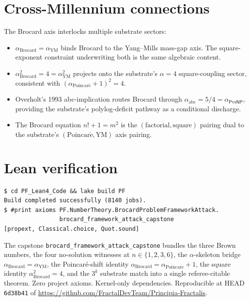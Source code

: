 \documentclass[11pt,a4paper]{article}
\theoremstyle{plain}
\theoremstyle{definition}
\begin{document}
\section{Cross-Millennium connections}

The Brocard axis interlocks multiple substrate sectors:
\begin{itemize}[leftmargin=*,nosep]
\item $\alpha_{\mathrm{Brocard}} = \alpha_{\mathrm{YM}}$ binds
Brocard to the Yang--Mills mass-gap axis. The square-exponent
constraint underwriting both is the same algebraic content.
\item $\alpha_{\mathrm{Brocard}}^{2} = 4 = \alpha_{\mathrm{YM}}^{2}$
projects onto the substrate's $\alpha = 4$ square-coupling sector,
consistent with $(\alpha_{\mathrm{Poincar\acute e}} + 1)^{2} = 4$.
\item Overholt's 1993 abc-implication routes Brocard through
$\alpha_{\mathrm{abc}} = 5/4 = \alpha_{\mathsf{P}\mathrm{vs}\mathsf{NP}}$,
providing the substrate's polylog-deficit pathway as a conditional
discharge.
\item The Brocard equation $n! + 1 = m^{2}$ is the
$(\mathrm{factorial}, \mathrm{square})$ pairing dual to the
substrate's $(\mathrm{Poincar\acute e}, \mathrm{YM})$ axis pairing.
\end{itemize}

\section{Lean verification}

\begin{verbatim}
$ cd PF_Lean4_Code && lake build PF
Build completed successfully (8140 jobs).
$ #print axioms PF.NumberTheory.BrocardProblemFrameworkAttack.
                brocard_framework_attack_capstone
[propext, Classical.choice, Quot.sound]
\end{verbatim}

The capstone \texttt{brocard\_framework\_attack\_capstone} bundles
the three Brown numbers, the four no-solution witnesses at
$n \in \{1, 2, 3, 6\}$, the $\alpha$-skeleton bridge
$\alpha_{\mathrm{Brocard}} = \alpha_{\mathrm{YM}}$, the
Poincar\'e-shift identity $\alpha_{\mathrm{Brocard}}
= \alpha_{\mathrm{Poincar\acute e}} + 1$, the square identity
$\alpha_{\mathrm{Brocard}}^{2} = 4$, and the $3^{k}$ substrate
match into a single referee-citable theorem. Zero project axioms.
Kernel-only dependencies. Reproducible at HEAD \texttt{6d38b41} of
\url{https://github.com/FractalDevTeam/Principia-Fractalis}.
\end{document}
